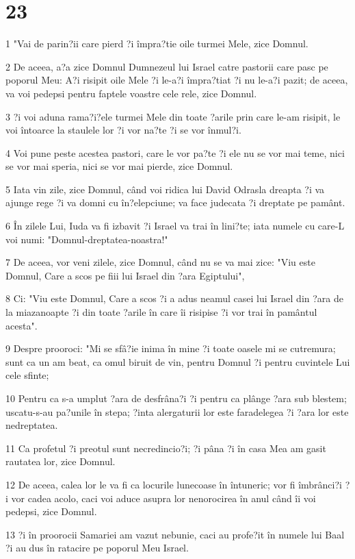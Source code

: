 \chapter{23}

\par 1 "Vai de parin?ii care pierd ?i împra?tie oile turmei Mele, zice Domnul.
\par 2 De aceea, a?a zice Domnul Dumnezeul lui Israel catre pastorii care pasc pe poporul Meu: A?i risipit oile Mele ?i le-a?i împra?tiat ?i nu le-a?i pazit; de aceea, va voi pedepsi pentru faptele voastre cele rele, zice Domnul.
\par 3 ?i voi aduna rama?i?ele turmei Mele din toate ?arile prin care le-am risipit, le voi întoarce la staulele lor ?i vor na?te ?i se vor înmul?i.
\par 4 Voi pune peste acestea pastori, care le vor pa?te ?i ele nu se vor mai teme, nici se vor mai speria, nici se vor mai pierde, zice Domnul.
\par 5 Iata vin zile, zice Domnul, când voi ridica lui David Odrasla dreapta ?i va ajunge rege ?i va domni cu în?elepciune; va face judecata ?i dreptate pe pamânt.
\par 6 În zilele Lui, Iuda va fi izbavit ?i Israel va trai în lini?te; iata numele cu care-L voi numi: "Domnul-dreptatea-noastra!"
\par 7 De aceea, vor veni zilele, zice Domnul, când nu se va mai zice: "Viu este Domnul, Care a scos pe fiii lui Israel din ?ara Egiptului",
\par 8 Ci: "Viu este Domnul, Care a scos ?i a adus neamul casei lui Israel din ?ara de la miazanoapte ?i din toate ?arile în care îi risipise ?i vor trai în pamântul acesta".
\par 9 Despre prooroci: "Mi se sfâ?ie inima în mine ?i toate oasele mi se cutremura; sunt ca un am beat, ca omul biruit de vin, pentru Domnul ?i pentru cuvintele Lui cele sfinte;
\par 10 Pentru ca s-a umplut ?ara de desfrâna?i ?i pentru ca plânge ?ara sub blestem; uscatu-s-au pa?unile în stepa; ?inta alergaturii lor este faradelegea ?i ?ara lor este nedreptatea.
\par 11 Ca profetul ?i preotul sunt necredincio?i; ?i pâna ?i în casa Mea am gasit rautatea lor, zice Domnul.
\par 12 De aceea, calea lor le va fi ca locurile lunecoase în întuneric; vor fi îmbrânci?i ?i vor cadea acolo, caci voi aduce asupra lor nenorocirea în anul când îi voi pedepsi, zice Domnul.
\par 13 ?i în proorocii Samariei am vazut nebunie, caci au profe?it în numele lui Baal ?i au dus în ratacire pe poporul Meu Israel.
